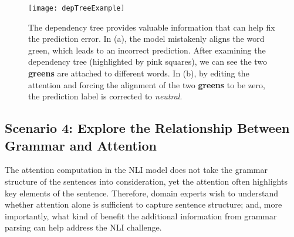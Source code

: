
%
\begin{figure*}[t]
\centering
\vspace{-2mm}
 \texttt{[image: depTreeExample]}
  \vspace{-6mm}
 \caption{
The dependency tree provides valuable information that can help fix the prediction error.
In (a), the model mistakenly aligns the word green, which leads to an incorrect prediction.
After examining the dependency tree (highlighted by pink squares), we can see the two \textbf{greens} are attached to different words.
In (b), by editing the attention and forcing the alignment of the two \textbf{greens} to be zero, the prediction label is corrected to \emph{neutral}.
 }
\label{fig:depTreeExample}
 \vspace{-4mm}
\end{figure*}

\subsection{Scenario 4: Explore the Relationship Between Grammar and Attention}
\label{sec:grammarAttention}
The attention computation in the NLI model does not take the grammar structure of the sentences into consideration,
yet the attention often highlights key elements of the sentence.
Therefore, domain experts wish to understand whether attention alone is sufficient to capture sentence structure;
and, more importantly, what kind of benefit the additional information from grammar parsing can help address the NLI challenge.

